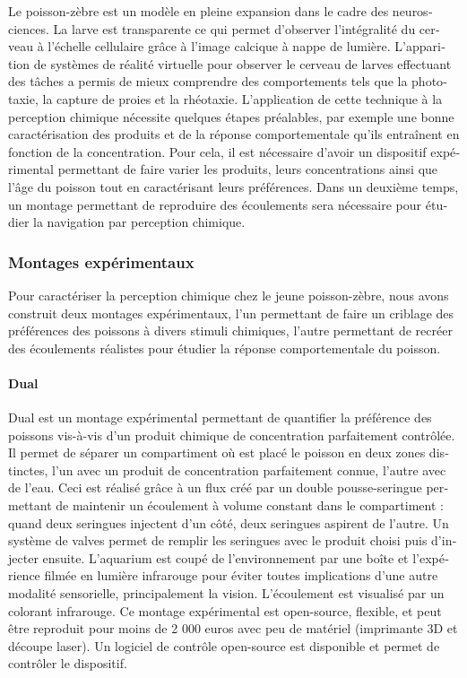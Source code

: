 \begin{otherlanguage}{french}
Le poisson-zèbre est un modèle en pleine expansion dans le cadre des neurosciences. La larve est transparente ce qui permet d'observer l'intégralité du cerveau à l'échelle cellulaire grâce à l'image calcique à nappe de lumière. L'apparition de systèmes de réalité virtuelle pour observer le cerveau de larves effectuant des tâches a permis de mieux comprendre des comportements tels que la phototaxie, la capture de proies et la rhéotaxie. L'application de cette technique à la perception chimique nécessite quelques étapes préalables, par exemple une bonne caractérisation des produits et de la réponse comportementale qu'ils entraînent en fonction de la concentration. Pour cela, il est nécessaire d'avoir un dispositif expérimental permettant de faire varier les produits, leurs concentrations ainsi que l'âge du poisson tout en caractérisant leurs préférences. Dans un deuxième temps, un montage permettant de reproduire des écoulements sera nécessaire pour étudier la navigation par perception chimique.

\subsubsection*{Montages expérimentaux}
Pour caractériser la perception chimique chez le jeune poisson-zèbre, nous avons construit deux montages expérimentaux, l'un permettant de faire un criblage des préférences des poissons à divers stimuli chimiques, l'autre permettant de recréer des écoulements réalistes pour étudier la réponse comportementale du poisson.

\paragraph{Dual} Dual est un montage expérimental permettant de quantifier la préférence des poissons vis-à-vis d'un produit chimique de concentration parfaitement contrôlée. Il permet de séparer un compartiment où est placé le poisson en deux zones distinctes, l'un avec un produit de concentration parfaitement connue, l'autre avec de l'eau. Ceci est réalisé grâce à un flux créé par un double pousse-seringue permettant de maintenir un écoulement à volume constant dans le compartiment : quand deux seringues injectent d'un côté, deux seringues aspirent de l'autre. Un système de valves permet de remplir les seringues avec le produit choisi puis d'injecter ensuite. L'aquarium est coupé de l'environnement par une boîte et l'expérience filmée en lumière infrarouge pour éviter toutes implications d'une autre modalité sensorielle, principalement la vision. L'écoulement est visualisé par un colorant infrarouge. Ce montage expérimental est open-source, flexible, et peut être reproduit pour moins de 2 000 euros avec peu de matériel (imprimante 3D et découpe laser). Un logiciel de contrôle open-source est disponible et permet de contrôler le dispositif.


\end{otherlanguage}
